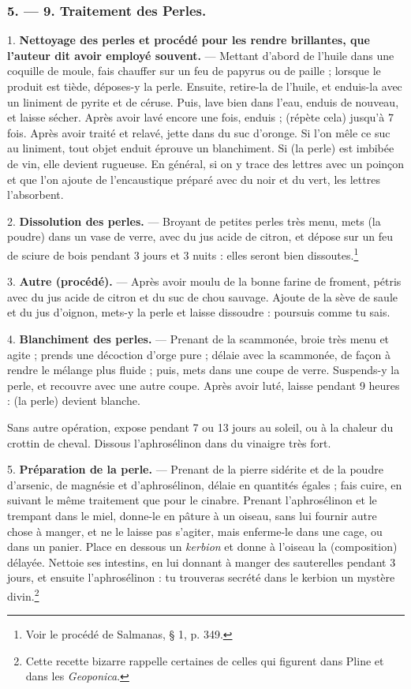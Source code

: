 \documentclass[a4paper, 11pt, oneside, polutonikogreek, french]{article}
\begin{document}
\bigskip
\centerline{\EightStarTaper}
\centerline{\EightStarTaper\EightStarTaper}
\bigskip

\subsubsection{5. --- 9. Traitement des Perles.}

1. \textbf{Nettoyage des perles et procédé pour les rendre brillantes, que l'auteur dit avoir employé souvent.} --- Mettant d'abord de l'huile dans une coquille de moule, fais chauffer sur un feu de papyrus ou de paille ; lorsque le produit est tiède, déposes-y la perle. Ensuite, retire-la de l'huile, et enduis-la avec un liniment de pyrite et de céruse. Puis, lave bien dans l'eau, enduis de nouveau, et laisse sécher. Après avoir lavé encore une fois, enduis ; (répète cela) jusqu'à 7 fois. Après avoir traité et relavé, jette dans du suc d'oronge. Si l'on mêle ce suc au liniment, tout objet enduit éprouve un blanchiment. Si (la perle) est imbibée de vin, elle devient rugueuse. En général, si on y trace des lettres avec un poinçon et que l'on ajoute de l'encaustique préparé avec du noir et du vert, les lettres l'absorbent.

2. \textbf{Dissolution des perles.} --- Broyant de petites perles très menu, mets (la poudre) dans un vase de verre, avec du jus acide de citron, et dépose sur un feu de sciure de bois pendant 3 jours et 3 nuits : elles seront bien dissoutes.\footnote{Voir le procédé de Salmanas, § 1, p. 349.}

3. \textbf{Autre (procédé).} --- Après avoir moulu de la bonne farine de froment, pétris avec du jus acide de citron et du suc de chou sauvage. Ajoute de la sève de saule et du jus d'oignon, mets-y la perle et laisse dissoudre : poursuis comme tu sais.

4. \textbf{Blanchiment des perles.} --- Prenant de la scammonée, broie très menu et agite ; prends une décoction d'orge pure ; délaie avec la scammonée, de façon à rendre le mélange plus fluide ; puis, mets dans une coupe de verre. Suspends-y la perle, et recouvre avec une autre coupe. Après avoir luté, laisse pendant 9 heures : (la perle) devient blanche.

Sans autre opération, expose pendant 7 ou 13 jours au soleil, ou à la chaleur du crottin de cheval. Dissous l'aphrosélinon dans du vinaigre très fort.

5. \textbf{Préparation de la perle.} --- Prenant de la pierre sidérite et de la poudre d'arsenic, de magnésie et d'aphrosélinon, délaie en quantités égales ; fais cuire, en suivant le même traitement que pour le cinabre. Prenant l'aphrosélinon et le trempant dans le miel, donne-le en pâture à un oiseau, sans lui fournir autre chose à manger, et ne le laisse pas s'agiter, mais enferme-le dans une cage, ou dans un panier. Place en dessous un \emph{kerbion} et donne à l'oiseau la (composition) délayée. Nettoie ses intestins, en lui donnant à manger des sauterelles pendant 3 jours, et ensuite l'aphrosélinon : tu trouveras secrété dans le kerbion un mystère divin.\footnote{Cette recette bizarre rappelle certaines de celles qui figurent dans Pline et dans les \emph{Geoponica}.}
\end{document}
